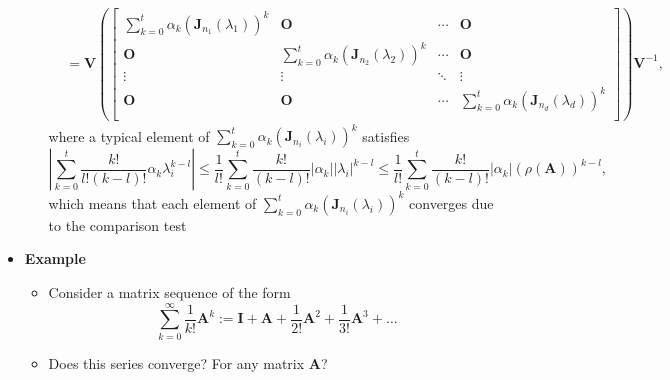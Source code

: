 \documentclass[12pt,a4paper]{article}
\begin{document}
\begin{itemize}
\begin{itemize}
\begin{align}
        & = 
      \bm{V}\left(
      \begin{bmatrix}
        \sum_{k=0}^{t}\alpha_{k}(\bm{J}_{n_{1}}(\lambda_{1}))^{k} & \bm{O} & \cdots & \bm{O} \\
        \bm{O} & \sum_{k=0}^{t}\alpha_{k}(\bm{J}_{n_{2}}(\lambda_{2}))^{k} & \cdots & \bm{O} \\
        \vdots & \vdots & \ddots & \vdots \\
        \bm{O} & \bm{O} & \cdots & \sum_{k=0}^{t}\alpha_{k}(\bm{J}_{n_{d}}(\lambda_{d}))^{k} \\
      \end{bmatrix}
      \right)\bm{V}^{-1},
    \nonumber%
    \end{align}
    where a typical element of $\sum_{k=0}^{t}\alpha_{k}(\bm{J}_{n_{i}}(\lambda_{i}))^{k}$ satisfies
    \begin{equation}\nonumber%
      \left|
      \sum_{k=0}^{t}\frac{k!}{l!(k-l)!}\alpha_{k}\lambda_{i}^{k-l}
      \right|
      \leq
      \frac{1}{l!}\sum_{k=0}^{t}\frac{k!}{(k-l)!}|\alpha_{k}||\lambda_{i}|^{k-l}
      \leq
      \frac{1}{l!}\sum_{k=0}^{t}\frac{k!}{(k-l)!}|\alpha_{k}|(\rho(\bm{A}))^{k-l},
    \end{equation}
    which means that each element of $\sum_{k=0}^{t}\alpha_{k}(\bm{J}_{n_{i}}(\lambda_{i}))^{k}$
    converges due to the comparison test
    
  \end{itemize}

\item \textbf{Example}
  \begin{itemize}
  \item Consider a matrix sequence of the form
    \begin{equation}\nonumber%
      \sum_{k=0}^{\infty} \frac{1}{k!}\bm{A}^{k}
      := \bm{I} + \bm{A} + \frac{1}{2!}\bm{A}^{2} + \frac{1}{3!}\bm{A}^{3} + \ldots
    \end{equation}
  \item Does this series converge? For any matrix $\bm{A}$?
  \end{itemize}


\end{itemize}
\end{document}
